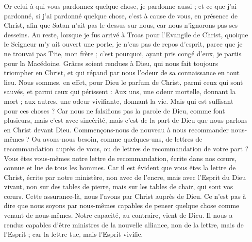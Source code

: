 \begin{multicols}{2}
Or celui à qui vous pardonnez quelque chose, je pardonne aussi ; et ce que j’ai pardonné, si j’ai pardonné quelque chose, c’est à cause de vous, en présence de Christ,
afin que Satan n'ait pas le dessus sur nous, car nous n'ignorons pas ses desseins.
Au reste, lorsque je fus arrivé à Troas pour l'Evangile de Christ, quoique le Seigneur m’y ait ouvert une porte, je n’eus pas de repos d’esprit, parce que je ne trouvai pas Tite, mon frère ;
c’est pourquoi, ayant pris congé d'eux, je partis pour la Macédoine.
Grâces soient rendues à Dieu, qui nous fait toujours triompher en Christ, et qui répand par nous l'odeur de sa connaissance en tout lieu.
Nous sommes, en effet, pour Dieu le parfum de Christ, parmi ceux qui sont sauvés, et parmi ceux qui périssent :
Aux uns, une odeur mortelle, donnant la mort ; aux autres, une odeur vivifiante, donnant la vie. Mais qui est suffisant pour ces choses ?
Car nous ne falsifions pas la parole de Dieu, comme font plusieurs, mais c’est avec sincérité, mais c’est de la part de Dieu que nous parlons en Christ devant Dieu.
\VerseOne{}Commençons-nous de nouveau à nous recommander nous-mêmes ? Ou avons-nous besoin, comme quelques-uns, de lettres de recommandation auprès de vous, ou de lettres de recommandation de votre part ?
Vous êtes vous-mêmes notre lettre de recommandation, écrite dans nos cœurs, connue et lue de tous les hommes.
Car il est évident que vous êtes la lettre de Christ, écrite par notre ministère, non avec de l'encre, mais avec l'Esprit du Dieu vivant, non sur des tables de pierre, mais sur les tables de chair, qui sont vos cœurs.
Cette assurance-là, nous l’avons par Christ auprès de Dieu.
Ce n’est pas à dire que nous soyons par nous-mêmes capables de penser quelque chose comme venant de nous-mêmes. Notre capacité, au contraire, vient de Dieu.
Il nous a rendus capables d'être ministres de la nouvelle alliance, non de la lettre, mais de l'Esprit ; car la lettre tue, mais l'Esprit vivifie.

\end{multicols}
